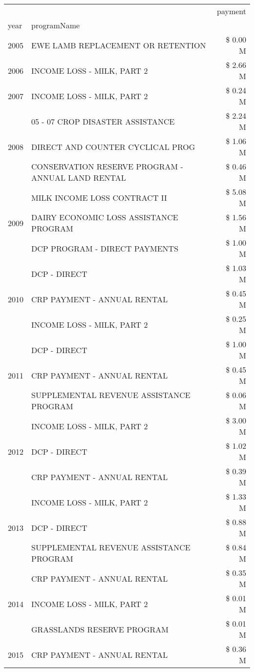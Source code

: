 \begin{tabular}{llr}
\toprule
 &  & payment \\
year & programName &  \\
\midrule
2005 & EWE LAMB REPLACEMENT OR RETENTION & \$ 0.00 M \\
\cline{1-3}
2006 & INCOME LOSS - MILK, PART 2 & \$ 2.66 M \\
\cline{1-3}
2007 & INCOME LOSS - MILK, PART 2 & \$ 0.24 M \\
\cline{1-3}
\multirow[t]{3}{*}{2008} & 05 - 07 CROP DISASTER ASSISTANCE & \$ 2.24 M \\
 & DIRECT AND COUNTER CYCLICAL PROG & \$ 1.06 M \\
 & CONSERVATION RESERVE PROGRAM - ANNUAL LAND RENTAL & \$ 0.46 M \\
\cline{1-3}
\multirow[t]{3}{*}{2009} & MILK INCOME LOSS CONTRACT II & \$ 5.08 M \\
 & DAIRY ECONOMIC LOSS ASSISTANCE PROGRAM & \$ 1.56 M \\
 & DCP PROGRAM - DIRECT PAYMENTS & \$ 1.00 M \\
\cline{1-3}
\multirow[t]{3}{*}{2010} & DCP - DIRECT & \$ 1.03 M \\
 & CRP PAYMENT - ANNUAL RENTAL & \$ 0.45 M \\
 & INCOME LOSS - MILK, PART 2 & \$ 0.25 M \\
\cline{1-3}
\multirow[t]{3}{*}{2011} & DCP - DIRECT & \$ 1.00 M \\
 & CRP PAYMENT - ANNUAL RENTAL & \$ 0.45 M \\
 & SUPPLEMENTAL REVENUE ASSISTANCE PROGRAM & \$ 0.06 M \\
\cline{1-3}
\multirow[t]{3}{*}{2012} & INCOME LOSS - MILK, PART 2 & \$ 3.00 M \\
 & DCP - DIRECT & \$ 1.02 M \\
 & CRP PAYMENT - ANNUAL RENTAL & \$ 0.39 M \\
\cline{1-3}
\multirow[t]{3}{*}{2013} & INCOME LOSS - MILK, PART 2 & \$ 1.33 M \\
 & DCP - DIRECT & \$ 0.88 M \\
 & SUPPLEMENTAL REVENUE ASSISTANCE PROGRAM & \$ 0.84 M \\
\cline{1-3}
\multirow[t]{3}{*}{2014} & CRP PAYMENT - ANNUAL RENTAL & \$ 0.35 M \\
 & INCOME LOSS - MILK, PART 2 & \$ 0.01 M \\
 & GRASSLANDS RESERVE PROGRAM & \$ 0.01 M \\
\cline{1-3}
\multirow[t]{3}{*}{2015} & CRP PAYMENT - ANNUAL RENTAL & \$ 0.36 M \\

\end{tabular}
